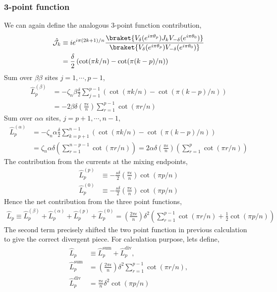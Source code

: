 \documentclass[11pt]{article}
\newcommand{\ep}{\epsilon}
\newcommand{\lb}{\left(}
\newcommand{\rb}{\right)}
\begin{document}
\subsubsection{3-point function}
We can again define the analogous 3-point function contribution,
\begin{align}
    \hat{\mathcal{J}}_k &\equiv ie^{i\pi (2k+1)/n}  \frac{\braket{V_{\delta}(e^{i\pi \theta_{p}})J_k V_{-\delta}(e^{i\pi \theta_{0}})}}{\braket{V_{\delta}(e^{i\pi \theta_{p}})V_{-\delta}(e^{i\pi \theta_{0}})}} \\
    &= \frac{\delta}{2} \lb \cot(\pi k/n) - \cot(\pi (k-p)/n) \rb
\end{align}
Sum over $\beta\beta$ sites $j = 1,\cdots, p-1$,
\begin{align}
    \hat{L}_p^{(\beta)} &= -\zeta_n\beta\frac{\delta}{2}\sum_{j=1}^{p-1} \lb \cot(\pi k/n) - \cot(\pi (k-p)/n) \rb \\
    &= -2\beta \delta \lb\frac{\pi \ep}{n}\rb\sum_{r=1}^{p-1}\cot(\pi r/n)
\end{align}
Sum over $\alpha \alpha$ sites, $j = p+1,\cdots, n-1$,
\begin{align}
    \hat{L}^{(\alpha)}_p &= -\zeta_n \alpha \frac{\delta}{2}\sum_{k=p+1}^{n-1}\lb\cot(\pi k/n) - \cot(\pi(k-p)/n)  \rb \\
    &=\zeta_n\alpha\delta \lb  \sum_{r=1}^{n-p-1} \cot(\pi r/n)  \rb = 2\alpha\delta \lb\frac{\pi \ep}{n}\rb \lb\sum_{r=1}^{p}\cot(\pi r/n)\rb
\end{align}
The contribution from the currents at the mixing endpoints,
\begin{align}
    \hat{L}_p^{(p)} &\equiv -\frac{s\delta}{2}\lb\frac{\pi \ep}{n}\rb\cot(\pi p/n) \\
    \hat{L}_p^{(0)} &\equiv -\frac{s\delta}{2}\lb\frac{\pi \ep}{n}\rb\cot(\pi p/n) 
\end{align}
Hence the net contribution from the three point functions,
\begin{align}
    \hat{L}_p \equiv \hat{L}_p^{(\beta)} + \hat{L}_p^{(\alpha)} + \hat{L}_p^{(p)} + \hat{L}_p^{(0)} = \lb\frac{2\pi \ep}{n}\rb \delta^2  \lb \sum_{r=1}^{p-1}\cot(\pi r/n) + \frac{1}{2}\cot(\pi p/n) \rb
\end{align}
The second term precisely shifted the two point function in previous calculation to give the correct divergent piece. For calculation purpose, lets define,
\begin{align}
     \hat{L}_p &\equiv  \hat{L}_p^{\text{sum}} + \hat{L}_p^{\text{div}},
     \\
     \hat{L}_p^{\text{sum}} &= \lb\frac{2\pi \ep}{n}\rb \delta^2   \sum_{r=1}^{p-1}\cot(\pi r/n) ,\\
     \hat{L}_p^{\text{div}} &= \frac{\pi \ep}{n}\delta^2\cot(\pi p/n)
\end{align}
\end{document}
